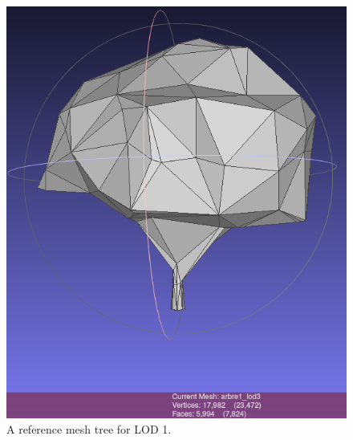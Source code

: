 \documentclass[12pt]{article}
\begin{document}
\begin{figure}[H]
\begin{minipage}{0.45\textwidth}
        \includegraphics[width=\textwidth]{images/lod1.png}
        \caption{A reference mesh tree for LOD 1.}
    \end{minipage}
\end{figure}
\end{document}

